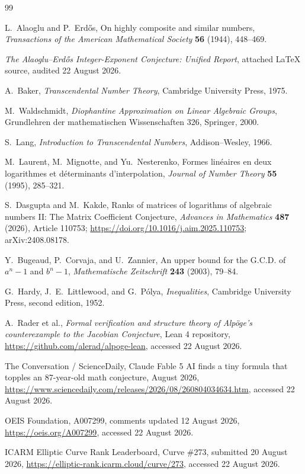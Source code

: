 \documentclass[11pt]{article}
\theoremstyle{definition}
\begin{document}
\begin{thebibliography}{99}

L.~Alaoglu and P.~Erd\H{o}s,
\newblock On highly composite and similar numbers,
\newblock \emph{Transactions of the American Mathematical Society} \textbf{56} (1944),
448--469.

\emph{The Alaoglu--Erd\H{o}s Integer-Exponent Conjecture: Unified Report},
\newblock attached LaTeX source, audited 22 August 2026.

A.~Baker,
\newblock \emph{Transcendental Number Theory},
\newblock Cambridge University Press, 1975.

M.~Waldschmidt,
\newblock \emph{Diophantine Approximation on Linear Algebraic Groups},
\newblock Grundlehren der mathematischen Wissenschaften 326, Springer, 2000.

S.~Lang,
\newblock \emph{Introduction to Transcendental Numbers},
\newblock Addison--Wesley, 1966.

M.~Laurent, M.~Mignotte, and Yu.~Nesterenko,
\newblock Formes lin\'eaires en deux logarithmes et d\'eterminants d'interpolation,
\newblock \emph{Journal of Number Theory} \textbf{55} (1995), 285--321.

S.~Dasgupta and M.~Kakde,
\newblock Ranks of matrices of logarithms of algebraic numbers II: The Matrix
Coefficient Conjecture,
\newblock \emph{Advances in Mathematics} \textbf{487} (2026), Article 110753;
\newblock \url{https://doi.org/10.1016/j.aim.2025.110753}; arXiv:2408.08178.

Y.~Bugeaud, P.~Corvaja, and U.~Zannier,
\newblock An upper bound for the G.C.D. of $a^n-1$ and $b^n-1$,
\newblock \emph{Mathematische Zeitschrift} \textbf{243} (2003), 79--84.

G.~Hardy, J.~E.~Littlewood, and G.~P\'olya,
\newblock \emph{Inequalities},
\newblock Cambridge University Press, second edition, 1952.

A.~Rader et al.,
\newblock \emph{Formal verification and structure theory of Alp\"oge's counterexample to
the Jacobian Conjecture}, Lean 4 repository,
\newblock \url{https://github.com/alerad/alpoge-lean}, accessed 22 August 2026.

The Conversation / ScienceDaily,
\newblock Claude Fable 5 AI finds a tiny formula that topples an 87-year-old math
conjecture,
 August 2026,
\url{https://www.sciencedaily.com/releases/2026/08/260804034634.htm}, accessed
22 August 2026.

OEIS Foundation,
\newblock A007299, comments updated 12 August 2026,
\newblock \url{https://oeis.org/A007299}, accessed 22 August 2026.

ICARM Elliptic Curve Rank Leaderboard,
\newblock Curve \#273, submitted 20 August 2026,
\newblock \url{https://elliptic-rank.icarm.cloud/curve/273}, accessed 22 August 2026.

\end{thebibliography}
\end{document}
